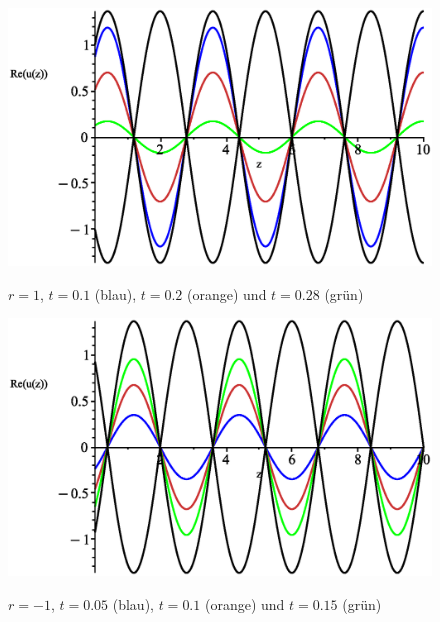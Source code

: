 \documentclass[paper=a4, parskip=half-, ngerman, fontsize=11pt]{scrreprt}
\begin{document}
\begin{figure}[H]
    \vspace{1ex}

    \begin{minipage}{0.45\textwidth}
        \centering
        \includegraphics[width=\linewidth]{../graphics/Enveloppe/verlustlos/R1}
        \caption*{$r=1$, $t=0.1$ (blau), $t=0.2$ (orange) und $t=0.28$ (grün)}
    \end{minipage}\hfill
    \begin{minipage}{0.45\textwidth}
        \centering
        \includegraphics[width=\linewidth]{../graphics/Enveloppe/verlustlos/R-1}
        \caption*{$r=-1$, $t=0.05$ (blau), $t=0.1$ (orange) und $t=0.15$ (grün)}
    \end{minipage}

    \captionsetup{labelformat=empty, skip=0pt}
    \caption{}
    \label{WellenausbreitungVerlustlos}
\end{figure}
\end{document}
